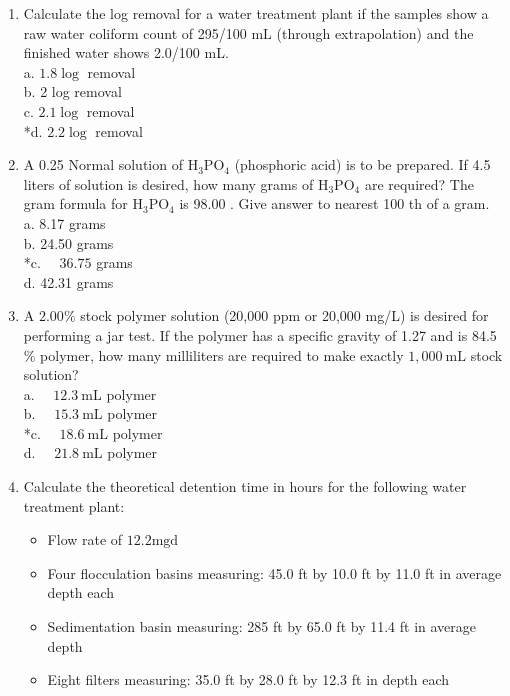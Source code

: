 \begin{enumerate}
\item Calculate the log removal for a water treatment plant if the samples show a raw water coliform count of 295/100 $\mathrm{mL}$ (through extrapolation) and the finished water shows 2.0/100 mL.\\
a. $1.8 \log$ removal\\
b. 2 log removal\\
c. $2.1 \log$ removal\\
*d. $2.2 \log$ removal\\
\item A 0.25 Normal solution of $\mathrm{H}_{3} \mathrm{PO}_{4}$ (phosphoric acid) is to be prepared. If 4.5 liters of solution is desired, how many grams of $\mathrm{H}_{3} \mathrm{PO}_{4}$ are required? The gram formula for $\mathrm{H}_{3} \mathrm{PO}_{4}$ is 98.00 . Give answer to nearest 100 th of a gram.\\
a. 8.17 grams\\
b. 24.50 grams\\
*c. $\quad 36.75$ grams\\
d. 42.31 grams\\
\item A $2.00 \%$ stock polymer solution (20,000 ppm or 20,000 mg/L) is desired for performing a jar test. If the polymer has a specific gravity of 1.27 and is 84.5 \% polymer, how many milliliters are required to make exactly $1,000 \mathrm{~mL}$ stock solution?\\
a. $\quad 12.3 \mathrm{~mL}$ polymer\\
b. $\quad 15.3 \mathrm{~mL}$ polymer\\
*c. $\quad 18.6 \mathrm{~mL}$ polymer\\
d. $\quad 21.8 \mathrm{~mL}$ polymer \\
\item Calculate the theoretical detention time in hours for the following water treatment plant:\\
\begin{itemize}
\item Flow rate of $12.2 \mathrm{mgd}$\\
\item Four flocculation basins measuring: 45.0 ft by 10.0 ft by 11.0 ft in average depth each\\
\item Sedimentation basin measuring: 285 ft by 65.0 ft by 11.4 ft in average depth\\
\item Eight filters measuring: 35.0 ft by 28.0 ft by 12.3 ft in depth each\\

\end{itemize}
\end{enumerate}

